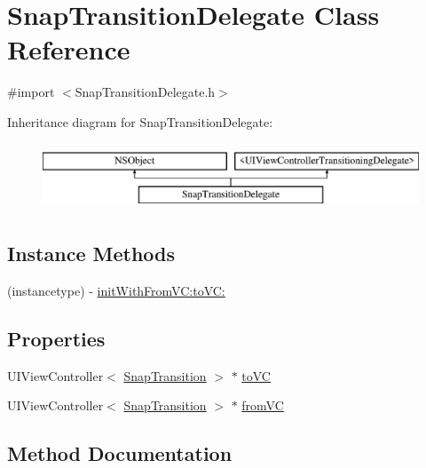\hypertarget{interface_snap_transition_delegate}{}\section{Snap\+Transition\+Delegate Class Reference}
\label{interface_snap_transition_delegate}


{\ttfamily \#import $<$Snap\+Transition\+Delegate.\+h$>$}

Inheritance diagram for Snap\+Transition\+Delegate\+:\begin{figure}[H]
\begin{center}
\leavevmode
\includegraphics[height=2.000000cm]{interface_snap_transition_delegate}
\end{center}
\end{figure}
\subsection*{Instance Methods}
\begin{DoxyCompactItemize}
\item 
(instancetype) -\/ \hyperlink{interface_snap_transition_delegate_af490767a6f1fc42f42bec86158e0cc84}{init\+With\+From\+V\+C\+:to\+V\+C\+:}
\end{DoxyCompactItemize}
\subsection*{Properties}
\begin{DoxyCompactItemize}
\item 
U\+I\+View\+Controller$<$ \hyperlink{protocol_snap_transition-p}{Snap\+Transition} $>$ $\ast$ \hyperlink{interface_snap_transition_delegate_a67d9c8e445f2d245ace64fc1866e5b48}{to\+VC}
\item 
U\+I\+View\+Controller$<$ \hyperlink{protocol_snap_transition-p}{Snap\+Transition} $>$ $\ast$ \hyperlink{interface_snap_transition_delegate_aa316a4eac25d32766f8cad197a44e4f0}{from\+VC}
\end{DoxyCompactItemize}


\subsection{Method Documentation}
\hypertarget{interface_snap_transition_delegate_af490767a6f1fc42f42bec86158e0cc84}{}\label{interface_snap_transition_delegate_af490767a6f1fc42f42bec86158e0cc84} 
